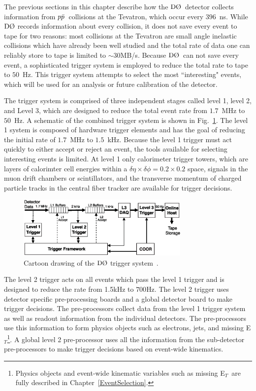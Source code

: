 The previous sections in this chapter describe how the $\dzero$~detector collects information from $\mbox{$p\bar{p}$}$~collisions at the Tevatron, which occur every $396$~ns. While $\dzero$ records information about every collision, it does not save every event to tape for two reasons: most collisions at the Tevatron are small angle inelastic collisions which have already been well studied and the total rate of data one can reliably store to tape is limited to $\sim$30MB/s. Because $\dzero$~can not save every event, a sophisticated trigger system is employed to reduce the total rate to tape to $50$~Hz. This trigger system attempts to select the most ``interesting" events, which will be used for an analysis or future calibration of the detector.

The trigger system is comprised of three independent stages called level 1, level 2, and Level 3, which are designed to reduce the total event rate from $1.7$~MHz to $50$~Hz. A schematic of the combined trigger system is shown in Fig.~\ref{Trigger}. The level 1 system is composed of hardware trigger elements and has the goal of reducing the initial rate of  $1.7$~MHz to $1.5$~kHz. Because the level 1 trigger must act quickly to either accept or reject an event, the tools available for selecting interesting events is limited. At level 1 only calorimeter trigger towers, which are layers of calorimter cell energies within a $\delta\eta \times \delta\phi = 0.2 \times 0.2$ space, signals in the muon drift chambers or scintillators, and the transverse momentum of charged particle tracks in the central fiber tracker are available for trigger decisions.

\begin{figure}[!h!tbp]
\begin{center}
\includegraphics[width=0.75\textwidth]{eps/D0/TriggerFlow.eps}
\end{center}
\vspace{-0.1in}
\caption{Cartoon drawing of the $\dzero$ trigger system~\cite{Abazov:2005pn}.}
\label{Trigger}
\end{figure}

The level 2 trigger acts on all events which pass the level 1 trigger and is designed to reduce the rate from 1.5kHz to $700$Hz. The level 2 trigger uses detector specific pre-processing boards and a global detector board to make trigger decisions. The pre-processors collect data from the level 1 trigger system as well as readout information from the individual detectors. The pre-processors use this information to form physics objects such as electrons, jets, and missing E$_{T}$\footnote{Physics objects and event-wide kinematic variables such as missing E$_{T}$~are fully described in Chapter~\ref{EventSelection}.}. A global level 2 pre-processor uses all the information from the sub-detector pre-processors to make trigger decisions based on event-wide kinematics.

